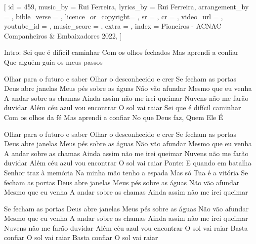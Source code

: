 [
    id                  = {459},
    music_by            = {Rui Ferreira}, %
    lyrics_by           = {Rui Ferreira}, %
    arrangement_by      = {}, %
    bible_verse         = {},
    licence_or_copyright= {},
    sr                  = {},
    cr                  = {},
    video_url           = {}, %
    youtube_id          = {}, %
    music_score         = {}, %
    extra               = {},
    index               = {Pioneiros - ACNAC Companheiros & Embaixadores 2022},
]

\beginverse
Intro:
Sei que é difícil caminhar
Com os olhos fechados
Mas aprendi a confiar 
Que alguém guia os meus passos

Olhar para o futuro e saber
Olhar o desconhecido e crer
\endverse
\beginchorus
Se fecham as portas
Deus abre janelas
Meus pés sobre as águas
Não vão afundar
Mesmo que eu venha
A andar sobre as chamas
Ainda assim não me irei queimar
Nuvens não me farão duvidar
Além céu azul vou encontrar
O sol vai raiar
\endchorus
\beginverse
Sei que é difícil caminhar
Com os olhos da fé 
Mas aprendi a confiar
No que Deus faz, Quem Ele É

Olhar para o futuro e saber
Olhar o desconhecido e crer
\endverse
\beginchorus
Se fecham as portas
Deus abre janelas
Meus pés sobre as águas
Não vão afundar
Mesmo que eu venha
A andar sobre as chamas
Ainda assim não me irei queimar
Nuvens não me farão duvidar
Além céu azul vou encontrar
O sol vai raiar
\endchorus
\beginverse
Ponte:
E quando em batalha
Senhor traz à memória
Na minha mão tenho a espada
Mas só Tua é a vitória
\endverse
\beginchorus
Se fecham as portas
Deus abre janelas
Meus pés sobre as águas
Não vão afundar
Mesmo que eu venha
A andar sobre as chamas
Ainda assim não me irei queimar

Se fecham as portas
Deus abre janelas
Meus pés sobre as águas
Não vão afundar
Mesmo que eu venha
A andar sobre as chamas
Ainda assim não me irei queimar
Nuvens não me farão duvidar
Além céu azul vou encontrar
O sol vai raiar
Basta confiar
O sol vai raiar
Basta confiar
O sol vai raiar
\endchorus
\endsong
